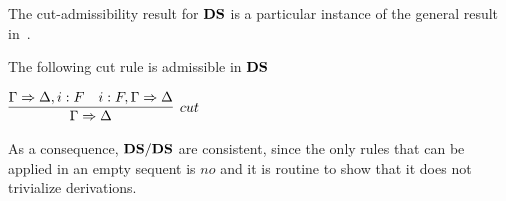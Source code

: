The cut-admissibility result for $\mathbf{DS}$ is a particular instance of the general result in~\cite{DBLP:journals/apal/MarinMPV22}.
\begin{theorem}\label{thm:cut}
The following cut rule is admissible in $\mathbf{DS}$

\vspace{0.15cm}
\qquad\qquad\qquad\qquad$
\infer[cut]{\Gamma\seq\Delta}{\Gamma\seq\Delta,i: F  & i: F ,\Gamma\seq\Delta}
$
\end{theorem}
As a consequence, %
$\mathbf{DS}/\mathbf{DS}$ are consistent, since the only rules that can be applied in an empty sequent is $no$ and it is routine to show that it does not trivialize derivations. 



